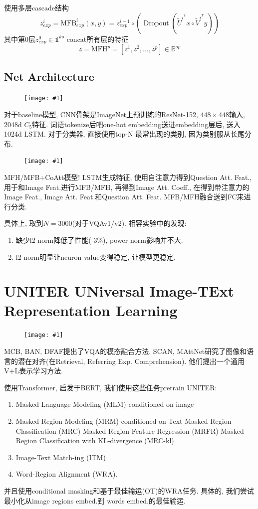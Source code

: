 \documentclass{article}
\newcommand{\cfig}[1]{
    \begin{figure}[htbp]
    \centering
    \texttt{[image: \#1]}
\end{figure}
}
\begin{document}
使用多层cascade结构
\begin{equation}
    z_{e x p}^{i}=\mathrm{MFB}_{e x p}^{i}(x, y)=z_{e x p}^{i-1} \circ\left(\operatorname{Dropout}\left(\tilde{U}^{i^{T}} x \circ \tilde{V}^{i^{T}} y\right)\right)
\end{equation}
其中第0层$z_{e x p}^{0} \in \mathbb{1}^{k o}$
concat所有层的特征
\begin{equation}
    z=\mathrm{MFH}^{p}=\left[z^{1}, z^{2}, \ldots, z^{p}\right] \in \mathbb{R}^{o p}
\end{equation}

\subsection{Net Architecture}

\cfig{vqa-arch.png}

对于baseline模型, 
CNN骨架是ImageNet上预训练的ResNet-152, $448\times 448$输入, 2048d $C_5$特征.
词语tokenize后吧one-hot embedding送进embedding层后, 送入1024d LSTM. 对于分类器, 直接使用top-N 最常出现的类别, 因为类别服从长尾分布.

\cfig{vqa-fullarch.png}

MFH/MFB+CoAtt模型! LSTM生成特征, 使用自注意力得到Question Att. Feat., 用于和Image Feat.进行MFB/MFH, 再得到Image Att. Coeff., 在得到带注意力的Image Feat., Image Att. Feat.和Question Att. Feat. MFB/MFH融合送到FC来进行分类.

具体上, 取到$N=3000$(对于VQAv1/v2). 
相容实验中的发现:\begin{enumerate}
    \item 缺少l2 norm降低了性能(-3\%), power norm影响并不大.
    \item l2 norm明显让neuron value变得稳定, 让模型更稳定.
\end{enumerate}

\section{UNITER UNiversal Image-TExt Representation Learning}

\cfig{uniter-arch.png}

MCB, BAN, DFAF提出了VQA的模态融合方法. SCAN, MAttNet研究了图像和语言的潜在对齐(在Retrieval, Referring Exp. Comprehension). 他们提出一个通用V+L表示学习方法.

使用Transformer, 启发于BERT, 我们使用这些任务pretrain UNITER:
\begin{enumerate}
    \item Masked Language Modeling (MLM) conditioned on image
    \item Masked Region Modeling (MRM) conditioned on Text
    \subitem Masked Region Classification (MRC)
    \subitem Masked Region Feature Regression (MRFR)
    \subitem Masked Region Classification with KL-divergence (MRC-kl)
    \item Image-Text Match-ing  (ITM)
    \item Word-Region  Alignment  (WRA).
\end{enumerate}
并且使用conditional masking和基于最佳输运(OT)的WRA任务. 具体的, 我们尝试最小化从image regions embed.到 words embed.的最佳输运.
\end{document}
